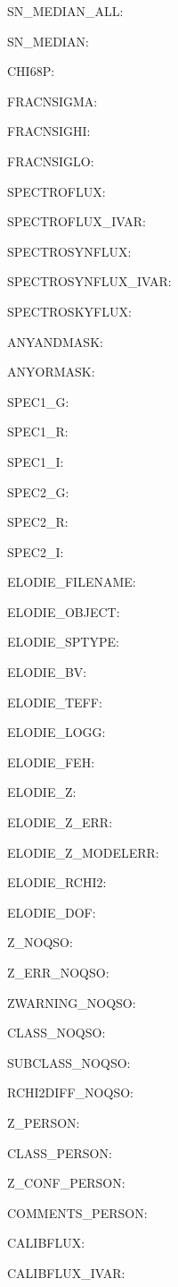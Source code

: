 \item SN\_MEDIAN\_ALL: 
\item SN\_MEDIAN: 
\item CHI68P: 
\item FRACNSIGMA: 
\item FRACNSIGHI: 
\item FRACNSIGLO: 
\item SPECTROFLUX: 
\item SPECTROFLUX\_IVAR: 
\item SPECTROSYNFLUX: 
\item SPECTROSYNFLUX\_IVAR: 
\item SPECTROSKYFLUX: 
\item ANYANDMASK: 
\item ANYORMASK: 
\item SPEC1\_G: 
\item SPEC1\_R: 
\item SPEC1\_I: 
\item SPEC2\_G: 
\item SPEC2\_R: 
\item SPEC2\_I: 
\item ELODIE\_FILENAME: 
\item ELODIE\_OBJECT: 
\item ELODIE\_SPTYPE: 
\item ELODIE\_BV: 
\item ELODIE\_TEFF: 
\item ELODIE\_LOGG: 
\item ELODIE\_FEH: 
\item ELODIE\_Z: 
\item ELODIE\_Z\_ERR: 
\item ELODIE\_Z\_MODELERR: 
\item ELODIE\_RCHI2: 
\item ELODIE\_DOF: 
\item Z\_NOQSO: 
\item Z\_ERR\_NOQSO: 
\item ZWARNING\_NOQSO: 
\item CLASS\_NOQSO: 
\item SUBCLASS\_NOQSO: 
\item RCHI2DIFF\_NOQSO: 
\item Z\_PERSON: 
\item CLASS\_PERSON: 
\item Z\_CONF\_PERSON: 
\item COMMENTS\_PERSON: 
\item CALIBFLUX: 
\item CALIBFLUX\_IVAR: 
